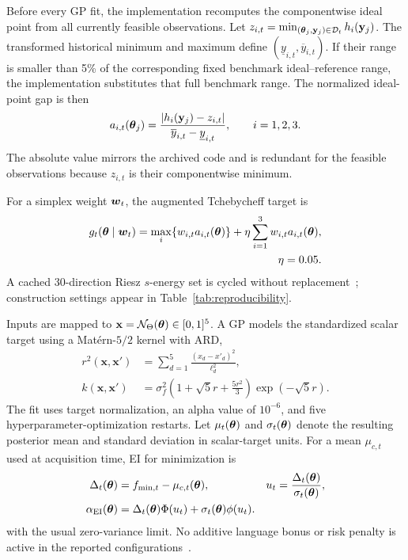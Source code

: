 Before every GP fit, the implementation recomputes the componentwise ideal
point from all currently feasible observations. Let
$z_{i,t}=\min_{(\boldsymbol{\theta}_j,\mathbf y_j)\in\mathcal{D}_t}h_i(\mathbf y_j)$.
The transformed historical minimum and maximum define
$(\underline y_{i,t},\overline y_{i,t})$. If their range is smaller than 5\%
of the corresponding fixed benchmark ideal--reference range, the
implementation substitutes that full benchmark range. The normalized
ideal-point gap is then
\begin{equation}
a_{i,t}(\boldsymbol{\theta}_j)=
\frac{|h_i(\mathbf y_j)-z_{i,t}|}
{\overline y_{i,t}-\underline y_{i,t}},\qquad i=1,2,3.
\label{eq:normalize}
\end{equation}
The absolute value mirrors the archived code and is redundant for the feasible
observations because $z_{i,t}$ is their componentwise minimum.

For a simplex weight $\boldsymbol{w}_t$, the augmented Tchebycheff target is
\begin{equation}
\begin{aligned}
g_t(\boldsymbol{\theta}\mid\boldsymbol{w}_t)=
\max_i\{w_{i,t}a_{i,t}(\boldsymbol{\theta})\}
{}+\eta\sum_{i=1}^{3}w_{i,t}a_{i,t}(\boldsymbol{\theta}),\\
\eta=0.05 .
\end{aligned}
\label{eq:tcheby}
\end{equation}
A cached 30-direction Riesz $s$-energy set is cycled without
replacement~\cite{ref21}; construction settings appear in
Table~\ref{tab:reproducibility}.

Inputs are mapped to $\mathbf x=\mathcal N_\Theta(\boldsymbol{\theta})\in[0,1]^5$. A GP
models the standardized scalar target using a Mat\'ern-$5/2$ kernel with ARD,
\begin{equation*}
\begin{aligned}
r^2(\mathbf x,\mathbf x')
&=\sum_{d=1}^{5}\frac{(x_d-x'_d)^2}{\ell_d^2},\\
k(\mathbf x,\mathbf x')
&=\sigma_f^2\!\left(1+\sqrt5r+\frac{5r^2}{3}\right)
\exp(-\sqrt5r).
\end{aligned}
\end{equation*}
The fit uses target normalization, an alpha value of $10^{-6}$, and five
hyperparameter-optimization restarts. Let $\mu_t(\boldsymbol{\theta})$ and
$\sigma_t(\boldsymbol{\theta})$ denote the resulting posterior mean and standard deviation
in scalar-target units. For a mean $\mu_{c,t}$ used at acquisition time, EI for
minimization is
\begin{align*}
\Delta_t(\boldsymbol{\theta})&=f_{\min,t}-\mu_{c,t}(\boldsymbol{\theta}),&
u_t&=\frac{\Delta_t(\boldsymbol{\theta})}{\sigma_t(\boldsymbol{\theta})},\\
\alpha_{\mathrm{EI}}(\boldsymbol{\theta})&=
\Delta_t(\boldsymbol{\theta})\Phi(u_t)+\sigma_t(\boldsymbol{\theta})\phi(u_t).
\end{align*}
with the usual zero-variance limit. No additive language bonus or risk penalty
is active in the reported configurations~\cite{ref20}.

